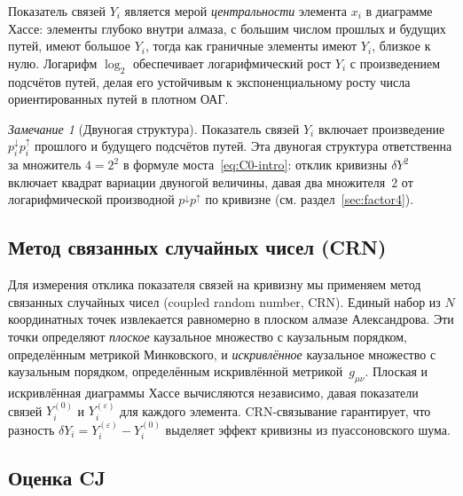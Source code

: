 \documentclass[12pt,a4paper]{article}
\theoremstyle{plain}
\theoremstyle{definition}
\theoremstyle{remark}
\newtheorem{remark}[theorem]{Замечание}
\begin{document}
Показатель связей $Y_i$ является мерой \emph{центральности}
элемента $x_i$ в диаграмме Хассе: элементы глубоко внутри
алмаза, с большим числом прошлых и будущих путей, имеют
большое $Y_i$, тогда как граничные элементы имеют $Y_i$,
близкое к нулю.  Логарифм $\log_2$ обеспечивает
логарифмический рост $Y_i$ с произведением подсчётов путей,
делая его устойчивым к экспоненциальному росту числа
ориентированных путей в плотном ОАГ.

\begin{remark}[Двуногая структура]
\label{rem:twolegs}
Показатель связей $Y_i$ включает произведение
$p_i^{\downarrow} p_i^{\uparrow}$ прошлого и будущего
подсчётов путей.  Эта двуногая структура ответственна за
множитель $4 = 2^2$ в формуле моста~\eqref{eq:C0-intro}:
отклик кривизны $\delta Y^2$ включает квадрат вариации
двуногой величины, давая два множителя~$2$ от логарифмической
производной $p^{\downarrow} p^{\uparrow}$ по кривизне
(см. раздел~\ref{sec:factor4}).
\end{remark}

\subsection{Метод связанных случайных чисел (CRN)}
\label{sec:crn}

Для измерения отклика показателя связей на кривизну мы
применяем метод связанных случайных чисел (coupled random
number, CRN).  Единый набор из $N$ координатных точек
извлекается равномерно в плоском алмазе Александрова.  Эти
точки определяют \emph{плоское} каузальное множество с
каузальным порядком, определённым метрикой Минковского, и
\emph{искривлённое} каузальное множество с каузальным
порядком, определённым искривлённой
метрикой~$g_{\mu\nu}$.  Плоская и искривлённая диаграммы
Хассе вычисляются независимо, давая показатели связей
$Y_i^{(0)}$ и $Y_i^{(\varepsilon)}$ для каждого элемента.
CRN-связывание гарантирует, что
разность $\delta Y_i = Y_i^{(\varepsilon)} - Y_i^{(0)}$
выделяет эффект кривизны из пуассоновского шума.

\subsection{Оценка CJ}
\label{sec:cjdef}
\end{document}
